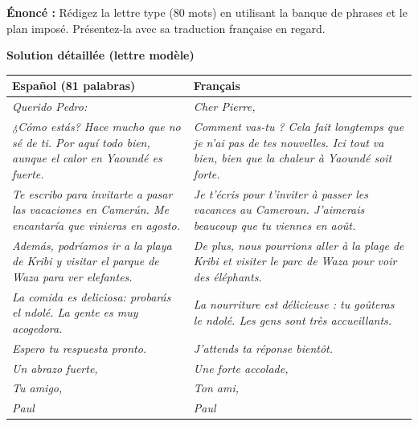 \documentclass[11pt]{article}
\newcommand{\esp}[1]{\ifmmode\text{\textit{#1}}\else\begingroup\selectlanguage{spanish}\itshape #1\endgroup\fi}
\begin{document}
\begin{exoresolu}
\textbf{Énoncé :} Rédigez la lettre type (80 mots) en utilisant la banque de phrases et le plan imposé. Présentez-la avec sa traduction française en regard.

\tcblower

\textbf{Solution détaillée (lettre modèle)}

\begin{center}
\begin{tabularx}{\linewidth}{|X|X|}
\hline
\rowcolor{popblueL} \textbf{Español (81 palabras)} & \textbf{Français} \\
\hline
\esp{Querido Pedro:} & \emph{Cher Pierre,} \\
\hline
\esp{¿Cómo estás? Hace mucho que no sé de ti. Por aquí todo bien, aunque el calor en Yaoundé es fuerte.} & \emph{Comment vas-tu ? Cela fait longtemps que je n'ai pas de tes nouvelles. Ici tout va bien, bien que la chaleur à Yaoundé soit forte.} \\
\hline
\esp{Te escribo para invitarte a pasar las vacaciones en Camerún. Me encantaría que vinieras en agosto.} & \emph{Je t'écris pour t'inviter à passer les vacances au Cameroun. J'aimerais beaucoup que tu viennes en août.} \\
\hline
\esp{Además, podríamos ir a la playa de Kribi y visitar el parque de Waza para ver elefantes.} & \emph{De plus, nous pourrions aller à la plage de Kribi et visiter le parc de Waza pour voir des éléphants.} \\
\hline
\esp{La comida es deliciosa: probarás el ndolé. La gente es muy acogedora.} & \emph{La nourriture est délicieuse : tu goûteras le ndolé. Les gens sont très accueillants.} \\
\hline
\esp{Espero tu respuesta pronto.} & \emph{J'attends ta réponse bientôt.} \\
\hline
\esp{Un abrazo fuerte,} & \emph{Une forte accolade,} \\
\hline
\esp{Tu amigo,} & \emph{Ton ami,} \\
\hline
\esp{Paul} & \emph{Paul} \\
\hline
\end{tabularx}
\end{center}


\end{exoresolu}
\end{document}
